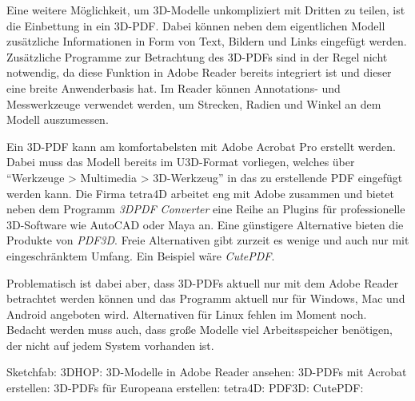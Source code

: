 Eine weitere Möglichkeit, um 3D-Modelle unkompliziert mit Dritten zu teilen, ist die Einbettung in ein 3D-PDF. Dabei können neben dem eigentlichen Modell zusätzliche Informationen in Form von Text, Bildern und Links eingefügt werden. Zusätzliche Programme zur Betrachtung des 3D-PDFs sind in der Regel nicht notwendig, da diese Funktion in Adobe Reader bereits integriert ist und dieser eine breite Anwenderbasis hat. Im Reader können Annotations- und Messwerkzeuge verwendet werden, um Strecken, Radien und Winkel an dem Modell auszumessen.

Ein 3D-PDF kann am komfortabelsten mit Adobe Acrobat Pro erstellt werden. Dabei muss das Modell bereits im U3D-Format vorliegen, welches über "`Werkzeuge > Multimedia > 3D-Werkzeug"' in das zu erstellende PDF eingefügt werden kann. Die Firma tetra4D arbeitet eng mit Adobe zusammen und bietet neben dem Programm \emph{3DPDF Converter} eine Reihe an Plugins für professionelle 3D-Software wie AutoCAD oder Maya an. Eine günstigere Alternative bieten die Produkte von \emph{PDF3D}. Freie Alternativen gibt zurzeit es wenige und auch nur mit eingeschränktem Umfang. Ein Beispiel wäre \emph{CutePDF}.

Problematisch ist dabei aber, dass 3D-PDFs aktuell nur mit dem Adobe Reader betrachtet werden können und das Programm aktuell nur für Windows, Mac und Android angeboten wird. Alternativen für Linux fehlen im Moment noch. Bedacht werden muss auch, dass große Modelle viel Arbeitsspeicher benötigen, der nicht auf jedem System vorhanden ist.

\begin{flushleft}
Sketchfab: 
3DHOP: 
3D-Modelle in Adobe Reader ansehen: 
3D-PDFs mit Acrobat erstellen: 
3D-PDFs für Europeana erstellen: 
tetra4D: 
PDF3D: 
CutePDF: 
\end{flushleft}

